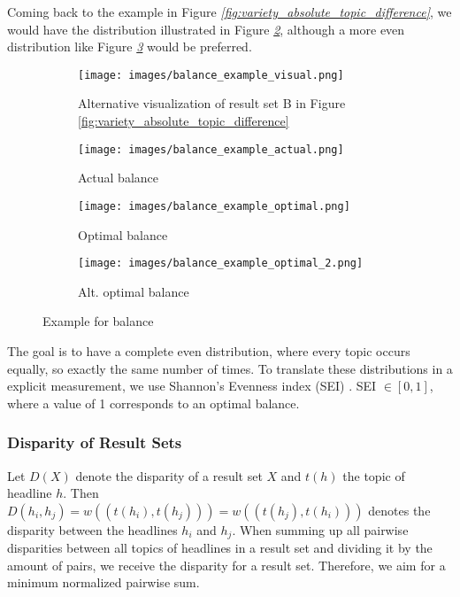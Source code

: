 Coming back to the example in Figure \textit{\ref{fig:variety_absolute_topic_difference}}, we would have the distribution illustrated in Figure \textit{\ref{subfig:balance_example_actual}}, although a more even distribution like Figure \textit{\ref{subfig:balance_example_optimal}} would be preferred.

\begin{figure}[tb]
    \centering
    \begin{subfigure}{\textwidth}
        \centering
        \texttt{[image: images/balance\_example\_visual.png]}
        \caption{Alternative visualization of result set B in Figure \ref{fig:variety_absolute_topic_difference}}
        \label{subfig:balance_example_visual}
    \end{subfigure}
    \begin{subfigure}{.3\textwidth}
        \centering
        \texttt{[image: images/balance\_example\_actual.png]}
        \caption{Actual balance}
        \label{subfig:balance_example_actual}
    \end{subfigure}
    \begin{subfigure}{.3\textwidth}
        \centering
        \texttt{[image: images/balance\_example\_optimal.png]}
        \caption{Optimal balance}
        \label{subfig:balance_example_optimal}
    \end{subfigure}
    \begin{subfigure}{.3\textwidth}
        \centering
        \texttt{[image: images/balance\_example\_optimal\_2.png]}
        \caption{Alt. optimal balance}
        \label{subfig:balance_example_optimal_2}
    \end{subfigure}
    \caption{Example for balance}
    \label{fig:balance_example}
\end{figure}


The goal is to have a complete even distribution, where every topic occurs equally, so exactly the same number of times. To translate these distributions in a explicit measurement, we use Shannon's Evenness index (SEI) \citep{loecherbach_unified_2020}. SEI $\in [0,1]$, where a value of 1 corresponds to an optimal balance.




\subsubsection{Disparity of Result Sets}

Let $D(X)$ denote the disparity of a result set $X$ and $t(h)$ the topic of headline $h$. Then $D(h_i, h_j) = w((t(h_i), t(h_j))) = w((t(h_j), t(h_i)))$ denotes the disparity between the headlines $h_i$ and $h_j$. When summing up all pairwise disparities between all topics of headlines in a result set and dividing it by the amount of pairs, we receive the disparity for a result set. Therefore, we aim for a minimum normalized pairwise sum.


